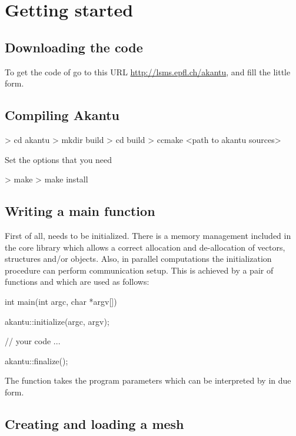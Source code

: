 \chapter{Getting started}
\section{Downloading the code}

To get the code of \akantu go to this URL \url{http://lsms.epfl.ch/akantu}, and fill the little form.

\section{Compiling Akantu}
\begin{command}
  > cd akantu
  > mkdir build
  > cd build
  > ccmake <path to akantu sources>
\end{command}

Set the options that you need

\begin{command}
  > make
  > make install
\end{command}

\section{Writing a main function\label{sect:common:main}}

First of all, \akantu needs to be initialized. 
There is a memory management included in the core library
which allows a correct allocation and de-allocation of 
vectors, structures and/or objects. Also, in parallel computations
the initialization procedure can perform communication 
setup. This is achieved by a pair of functions 
and  which are used as follows:
\begin{cpp}
int main(int argc, char *argv[])
{
  akantu::initialize(argc, argv);

  // your code
  ... 

  akantu::finalize();
}
\end{cpp} 
The  function takes the program parameters which 
can be interpreted by \akantu in due form.

\section{Creating and loading a mesh\label{sect:common:mesh}}

